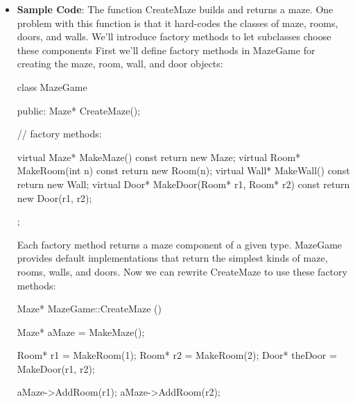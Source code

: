 \documentclass{report}
\begin{document}
\begin{itemize}
\begin{enumerate}
\begin{cppcode}
                        StandardCreator<MyProduct> myCreator;
                    \end{cppcode}
                \item \textbf{Naming conventions}. It's good practice to use naming conventions that make it clear you're using factory methods. For example, the MacApp Macintosh application framework always declares the abstract operation that defines the factory method as Class* DoMakeClass(), where Class is the Product class.
            \end{enumerate}
        \item \textbf{Sample Code}: The function CreateMaze builds and returns a maze. One problem with this function is that it hard-codes the classes of maze, rooms, doors, and walls. We'll introduce factory methods to let subclasses choose these components
            \bigbreak \noindent 
            First we'll define factory methods in MazeGame for creating the maze, room, wall, and door objects:
            \bigbreak \noindent 
            \begin{cppcode}
                class MazeGame {
                public:
                    Maze* CreateMaze();

                    // factory methods:

                    virtual Maze* MakeMaze() const
                        { return new Maze; }
                    virtual Room* MakeRoom(int n) const
                        { return new Room(n); }
                    virtual Wall* MakeWall() const
                        { return new Wall; }
                    virtual Door* MakeDoor(Room* r1, Room* r2) const
                        { return new Door(r1, r2); }
                };
            \end{cppcode}
            \bigbreak \noindent 
            Each factory method returns a maze component of a given type. MazeGame provides default implementations that return the simplest kinds of maze, rooms, walls, and doors.
            \bigbreak \noindent 
            Now we can rewrite CreateMaze to use these factory methods:
            \bigbreak \noindent 
            \begin{cppcode}
                Maze* MazeGame::CreateMaze () {
                    Maze* aMaze = MakeMaze();

                    Room* r1 = MakeRoom(1);
                    Room* r2 = MakeRoom(2);
                    Door* theDoor = MakeDoor(r1, r2);

                    aMaze->AddRoom(r1);
                    aMaze->AddRoom(r2);

}
\end{cppcode}
\end{itemize}
\end{document}
